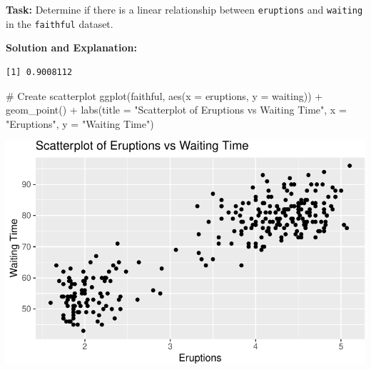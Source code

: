 \documentclass[
  letterpaper,
  DIV=11,
  numbers=noendperiod]{scrreprt}
\newenvironment{Shaded}{\begin{snugshade}}{\end{snugshade}}
\newcommand{\AttributeTok}[1]{\textcolor[rgb]{0.40,0.45,0.13}{#1}}
\newcommand{\CommentTok}[1]{\textcolor[rgb]{0.37,0.37,0.37}{#1}}
\newcommand{\FunctionTok}[1]{\textcolor[rgb]{0.28,0.35,0.67}{#1}}
\newcommand{\NormalTok}[1]{\textcolor[rgb]{0.00,0.23,0.31}{#1}}
\newcommand{\OtherTok}[1]{\textcolor[rgb]{0.00,0.23,0.31}{#1}}
\newcommand{\SpecialCharTok}[1]{\textcolor[rgb]{0.37,0.37,0.37}{#1}}
\newcommand{\StringTok}[1]{\textcolor[rgb]{0.13,0.47,0.30}{#1}}
\begin{document}
\textbf{Task:} Determine if there is a linear relationship between
\texttt{eruptions} and \texttt{waiting} in the \texttt{faithful}
dataset.

\textbf{Solution and Explanation:}

\begin{Shaded}
\end{Shaded}

\begin{verbatim}
[1] 0.9008112
\end{verbatim}

\begin{Shaded}
\begin{Highlighting}[]
\CommentTok{\# Create scatterplot}
\FunctionTok{ggplot}\NormalTok{(faithful, }\FunctionTok{aes}\NormalTok{(}\AttributeTok{x =}\NormalTok{ eruptions, }\AttributeTok{y =}\NormalTok{ waiting)) }\SpecialCharTok{+}
  \FunctionTok{geom\_point}\NormalTok{() }\SpecialCharTok{+}
  \FunctionTok{labs}\NormalTok{(}\AttributeTok{title =} \StringTok{"Scatterplot of Eruptions vs Waiting Time"}\NormalTok{, }\AttributeTok{x =} \StringTok{"Eruptions"}\NormalTok{, }\AttributeTok{y =} \StringTok{"Waiting Time"}\NormalTok{)}
\end{Highlighting}
\end{Shaded}

\includegraphics{Scatterplots_and_Correlation_files/figure-pdf/unnamed-chunk-10-1.pdf}
\end{document}
